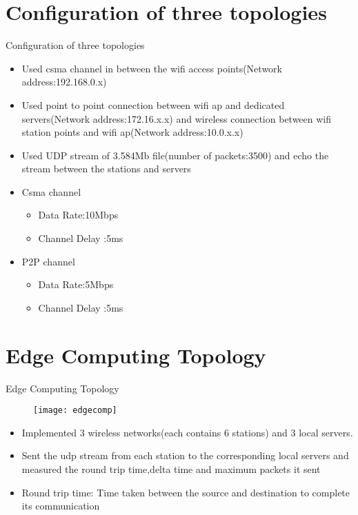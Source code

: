 \documentclass{beamer}
\begin{document}
\section{Configuration of three topologies}
\begin{frame}{Configuration of three topologies}
\begin{itemize}
	\item Used csma channel in between the wifi access points(Network address:192.168.0.x)
	\item Used point to point connection between wifi ap and dedicated servers(Network address:172.16.x.x) and wireless connection between wifi station points and wifi ap(Network address:10.0.x.x)
	\item Used UDP stream of 3.584Mb file(number of packets:3500) and echo the stream between the stations and servers
	\item Csma channel
	\begin{itemize}
		\item Data Rate:10Mbps
		\item Channel Delay :5ms
	\end{itemize}
	\item P2P channel
	\begin{itemize}
		\item Data Rate:5Mbps
		\item Channel Delay :5ms
	\end{itemize}
	
\end{itemize}
\end{frame}
\section{Edge Computing Topology}

\begin{frame}{Edge Computing Topology}
\begin{figure}
\texttt{[image: edgecomp]}
\centering
\end{figure}

\begin{itemize}
	\item Implemented 3 wireless networks(each contains 6 stations) and 3 local servers. 
	\item Sent the udp stream from each station to the corresponding local servers and measured the round trip time,delta time and maximum packets it sent
	\item Round trip time: Time taken between the source and destination to complete its communication

\end{itemize}

\end{frame}
\end{document}
